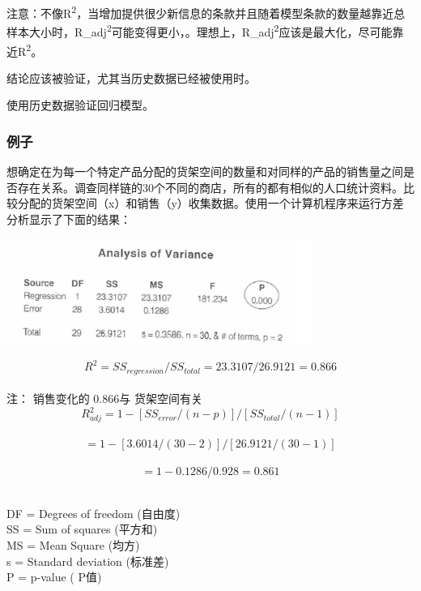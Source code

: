 注意：不像R\textsuperscript{2}，当增加提供很少新信息的条款并且随着模型条款的数量越靠近总样本大小时，R\_adj\textsuperscript{2}可能变得更小，。理想上，R\_adj\textsuperscript{2}应该是最大化，尽可能靠近R\textsuperscript{2}。

结论应该被验证，尤其当历史数据已经被使用时。

使用历史数据验证回归模型。


\hypertarget{ux80ccux666f}{%
\subsubsection{例子}\label{ux80ccux666f}}

想确定在为每一个特定产品分配的货架空间的数量和对同样的产品的销售量之间是否存在关系。调查同样链的30个不同的商店，所有的都有相似的人口统计资料。比较分配的货架空间（x）和销售（y）收集数据。使用一个计算机程序来运行方差分析显示了下面的结果：




\includegraphics[width=10cm]{Ch24rrScreenshot2023-04-02094408.jpg}

\[{R}^2 = {SS}_{regression} / {SS}_{total} = 23.3107 / 26.9121 = 0.866\]\\
注： 销售变化的 0.866与 货架空间有关\\

\[{R}_{adj}^2 = 1 - [{SS}_{error} / (n - p)] / [{SS}_{total} / (n - 1)]\]\\
\[= 1 - [3.6014 / (30 - 2)] / [26.9121 / (30 - 1)]\]\\
\[= 1 - 0.1286 / 0.928 = 0.861\]\\

\begin{description}
\tightlist
\item[]
DF = Degrees of freedom (自由度)\\
SS = Sum of squares (平方和)\\
MS = Mean Square (均方)\\
s = Standard deviation (标准差)\\
P = p-value ( P值)\\
\end{description}

